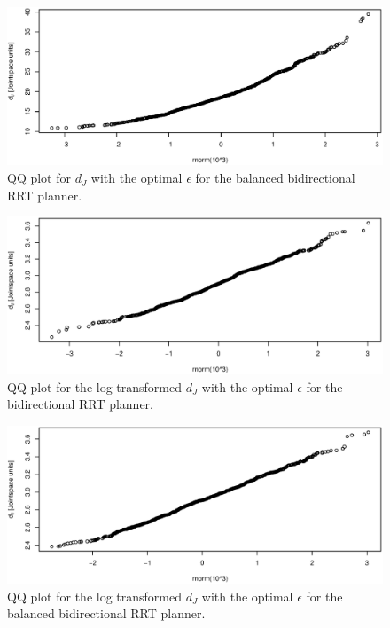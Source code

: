 \begin{figure}[h]
 \centering
 \includegraphics[width=\figsize]{graphics/qq_op_ba}
 \caption{QQ plot for \(d_J\) with the optimal \(\epsilon\) for the balanced bidirectional RRT planner.}
 \label{fig:balanced_correlated}
\end{figure}

\begin{figure}[h]
 \centering
 \includegraphics[width=\figsize]{graphics/qq_tran_op_bi}
 \caption{QQ plot for the log transformed \(d_J\) with the optimal \(\epsilon\) for the bidirectional RRT planner.}
 \label{fig:balanced_correlated}
\end{figure}

\begin{figure}[h]
 \centering
 \includegraphics[width=\figsize]{graphics/qq_tran_op_ba}
 \caption{QQ plot for the log transformed \(d_J\) with the optimal \(\epsilon\) for the balanced bidirectional RRT planner.}
 \label{fig:balanced_correlated}
\end{figure}



